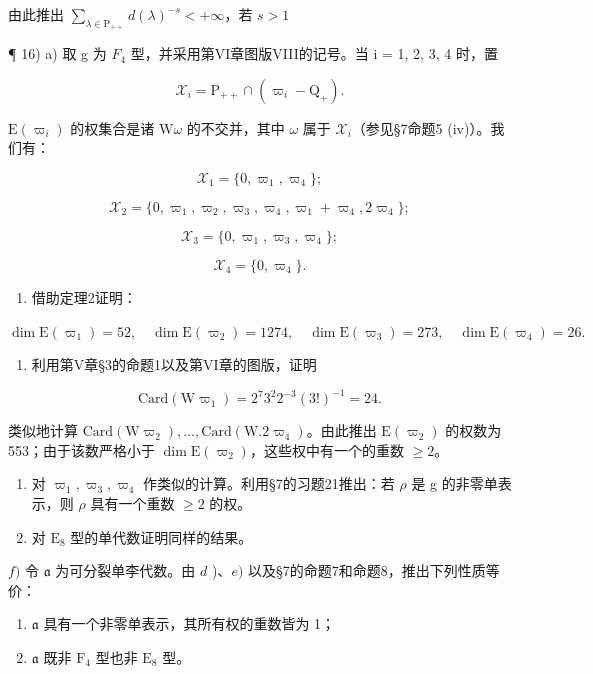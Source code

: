 由此推出 \(\sum_{\lambda \in \mathrm{P}_{+ + }}d(\lambda)^{-s} <   + \infty\)，若 \(s > 1\)

¶ 16) a) 取 g 为 \(F_{4}\) 型，并采用第VI章图版VIII的记号。当 i = 1, 2, 3, 4 时，置

\[
\mathcal {X} _ {i} = \mathrm{P} _ {+ +} \cap (\varpi_ {i} - \mathrm{Q} _ {+}).
\]

\(\mathrm{E}(\varpi_i)\) 的权集合是诸 \(\mathrm{W}\omega\) 的不交并，其中 \(\omega\) 属于 \(\mathcal{X}_i\)（参见§7命题5 (iv)）。我们有：

\[
\mathcal {X} _ {1} = \{0, \varpi_ {1}, \varpi_ {4} \};
\]

\[
\mathcal {X} _ {2} = \{0, \varpi_ {1}, \varpi_ {2}, \varpi_ {3}, \varpi_ {4}, \varpi_ {1} + \varpi_ {4}, 2 \varpi_ {4} \};
\]

\[
\mathcal {X} _ {3} = \{0, \varpi_ {1}, \varpi_ {3}, \varpi_ {4} \};
\]

\[
\mathcal {X} _ {4} = \{0, \varpi_ {4} \}.
\]

\begin{enumerate}
\def\labelenumi{\alph{enumi})}
\setcounter{enumi}{1}
\tightlist
\item
  借助定理2证明：
\end{enumerate}

\(\dim \mathrm{E}(\varpi_1) = 52,\quad \dim \mathrm{E}(\varpi_2) = 1274,\quad \dim \mathrm{E}(\varpi_3) = 273,\quad \dim \mathrm{E}(\varpi_4) = 26.\)

\begin{enumerate}
\def\labelenumi{\alph{enumi})}
\setcounter{enumi}{2}
\tightlist
\item
  利用第V章§3的命题1以及第VI章的图版，证明
\end{enumerate}

\[
\mathrm{Card} (\mathrm{W} \varpi_ {1}) = 2 ^ {7} 3 ^ {2} 2 ^ {- 3} (3!) ^ {- 1} = 24.
\]

类似地计算 \(\mathrm{Card}(\mathrm{W}\varpi_{2}),\ldots,\mathrm{Card}(\mathrm{W}.2\varpi_{4})\)。由此推出 \(\mathrm{E}(\varpi_{2})\) 的权数为 553；由于该数严格小于 \(\dim\mathrm{E}(\varpi_{2})\)，这些权中有一个的重数 \(\geq2\)。

\begin{enumerate}
\def\labelenumi{\alph{enumi})}
\setcounter{enumi}{3}
\item
  对 \(\varpi_{1},\varpi_{3},\varpi_{4}\) 作类似的计算。利用§7的习题21推出：若 \(\rho\) 是 g 的非零单表示，则 \(\rho\) 具有一个重数 \(\geq2\) 的权。
\item
  对 \(\mathrm{E}_8\) 型的单代数证明同样的结果。
\end{enumerate}

\(f)\) 令 \(\mathfrak{a}\) 为可分裂单李代数。由 \(d\) )、\(e)\) 以及§7的命题7和命题8，推出下列性质等价：

\begin{enumerate}
\def\labelenumi{(\roman{enumi})}
\item
  \(\mathfrak{a}\) 具有一个非零单表示，其所有权的重数皆为 1；
\item
  \(\mathfrak{a}\) 既非 \(\mathrm{F}_4\) 型也非 \(\mathrm{E}_8\) 型。
\end{enumerate}

